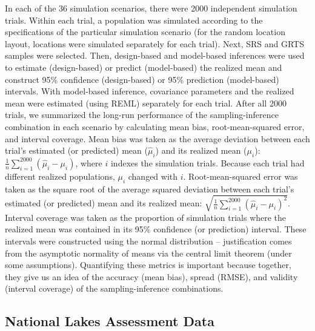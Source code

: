 \documentclass[]{elsarticle} %
\begin{document}
In each of the 36 simulation scenarios, there were 2000 independent
simulation trials. Within each trial, a population was simulated
according to the specifications of the particular simulation scenario
(for the random location layout, locations were simulated separately for
each trial). Next, SRS and GRTS samples were selected. Then,
design-based and model-based inferences were used to estimate
(design-based) or predict (model-based) the realized mean and construct
95\% confidence (design-based) or 95\% prediction (model-based)
intervals. With model-based inference, covariance parameters and the
realized mean were estimated (using REML) separately for each trial.
After all 2000 trials, we summarized the long-run performance of the
sampling-inference combination in each scenario by calculating mean
bias, root-mean-squared error, and interval coverage. Mean bias was
taken as the average deviation between each trial's estimated (or
predicted) mean (\(\hat{\mu}_i\)) and its realized mean (\(\mu_i\)):
\(\frac{1}{n}\sum_{i = 1}^{2000} (\hat{\mu}_i - \mu_i)\), where \(i\)
indexes the simulation trials. Because each trial had different realized
populations, \(\mu_i\) changed with \(i\). Root-mean-squared error was
taken as the square root of the average squared deviation between each
trial's estimated (or predicted) mean and its realized mean:
\(\sqrt{\frac{1}{n}\sum_{i = 1}^{2000} (\hat{\mu}_i - \mu_i)^2}\).
Interval coverage was taken as the proportion of simulation trials where
the realized mean was contained in its 95\% confidence (or prediction)
interval. These intervals were constructed using the normal distribution
-- justification comes from the asymptotic normality of means via the
central limit theorem (under some assumptions). Quantifying these
metrics is important because together, they give us an idea of the
accuracy (mean bias), spread (RMSE), and validity (interval coverage) of
the sampling-inference combinations.

\hypertarget{sec:mm_app}{%
\subsection{National Lakes Assessment Data}\label{sec:mm_app}}
\end{document}
